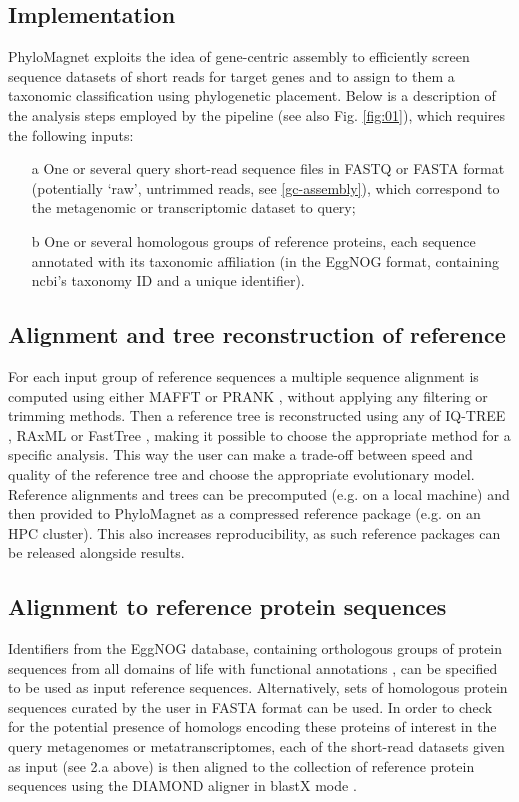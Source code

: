 \documentclass{bioinfo}
\begin{document}
\begin{methods}
\section{Implementation}
PhyloMagnet exploits the idea of gene-centric assembly \citep{Huson2017} to efficiently screen sequence datasets  of short reads for target genes and to assign to them a taxonomic classification using phylogenetic placement. Below is a description of the analysis steps employed by the pipeline (see also Fig. \ref{fig:01}), which requires the following inputs: 
\begin{enumerate}

\item[a] One or several query short-read sequence files in FASTQ or FASTA format (potentially ‘raw’, untrimmed reads, see \ref{gc-assembly}), which correspond to the metagenomic or transcriptomic dataset to query;
\item[b] One or several homologous groups of reference proteins, each sequence annotated with its taxonomic affiliation (in the EggNOG format, containing ncbi’s taxonomy ID and a unique identifier).
\end{enumerate}

\subsection{Alignment and tree reconstruction of reference}
For each input group of reference sequences a multiple sequence alignment is computed using either MAFFT \citep{Katoh2013} or PRANK \citep{Loytynoja2010}, without applying any filtering or trimming methods. Then a reference tree is reconstructed using any of IQ-TREE \citep{Nguyen2015}, RAxML \citep{Stamatakis2014} or FastTree \citep{Price2010}, making it possible to choose the appropriate method for a specific analysis. This way the user can make a trade-off between speed and quality of the reference tree and choose the appropriate evolutionary model. Reference alignments and trees can be precomputed (e.g. on a local machine) and then provided to PhyloMagnet as a compressed reference package (e.g. on an HPC cluster). This also increases reproducibility, as such reference packages can be released alongside results.

\subsection{Alignment to reference protein sequences}
Identifiers from the EggNOG database, containing orthologous groups of protein sequences from all domains of life with functional annotations \citep{Huerta-cepas2016b}, can be specified to be used as input reference sequences. Alternatively, sets of homologous protein sequences curated by the user in FASTA format can be used. In order to check for the potential presence of homologs encoding these proteins of interest in the query metagenomes or metatranscriptomes, each of the short-read datasets given as input (see 2.a above) is then aligned to the collection of reference protein sequences using the DIAMOND aligner in blastX mode \citep{Buchfink2014}.


\end{methods}
\end{document}
